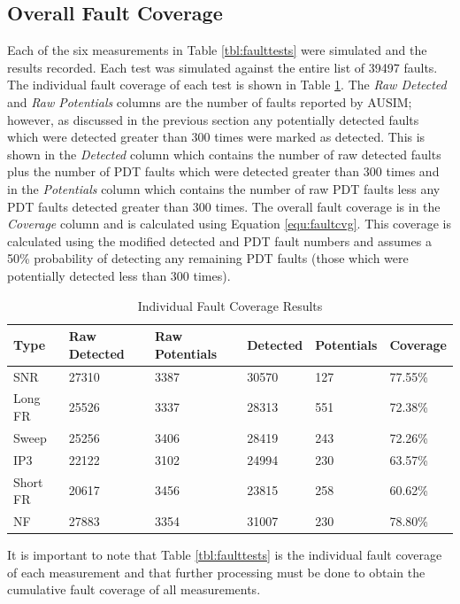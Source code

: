 \documentclass[12pt]{report}
\begin{document}
\subsection{Overall Fault Coverage}
Each of the six measurements in Table \ref{tbl:faulttests} were simulated and the results recorded.  Each test was simulated against the entire list of 39497 faults.  The individual fault coverage of each test is shown in Table \ref{tbl:faultresults}.  The \textit{Raw Detected} and \textit{Raw Potentials} columns are the number of faults reported by AUSIM; however, as discussed in the previous section any potentially detected faults which were detected greater than 300 times were marked as detected.  This is shown in the \textit{Detected} column which contains the number of raw detected faults plus the number of PDT faults which were detected greater than 300 times and in the \textit{Potentials} column which contains the number of raw PDT faults less any PDT faults detected greater than 300 times.  The overall fault coverage is in the \textit{Coverage} column and is calculated using Equation \ref{equ:faultcvg}.  This coverage is calculated using the modified detected and PDT fault numbers and assumes a 50\% probability of detecting any remaining PDT faults (those which were potentially detected less than 300 times).
\begin{table}
  \begin{center}
    \caption{Individual Fault Coverage Results}
    \label{tbl:faultresults}
    \begin{tabular}{|l|l|l|l|l|l|}
      \hline
      Type & Raw Detected & Raw Potentials & Detected & Potentials & Coverage \\ \hline
      SNR & 27310 & 3387 & 30570 & 127 & 77.55\% \\ \hline
      Long FR & 25526 & 3337 & 28313 & 551 & 72.38\% \\ \hline
      Sweep & 25256 & 3406 & 28419 & 243 & 72.26\% \\ \hline 
      IP3 & 22122 & 3102 & 24994 & 230 & 63.57\% \\ \hline
      Short FR & 20617 & 3456 & 23815 & 258 & 60.62\% \\ \hline 
      NF & 27883 & 3354 & 31007 & 230 & 78.80\% \\ 
      \hline
    \end{tabular}
  \end{center}
\end{table}
It is important to note that Table \ref{tbl:faulttests} is the individual fault coverage of each measurement and that further processing must be done to obtain the cumulative fault coverage of all measurements.  
\end{document}
